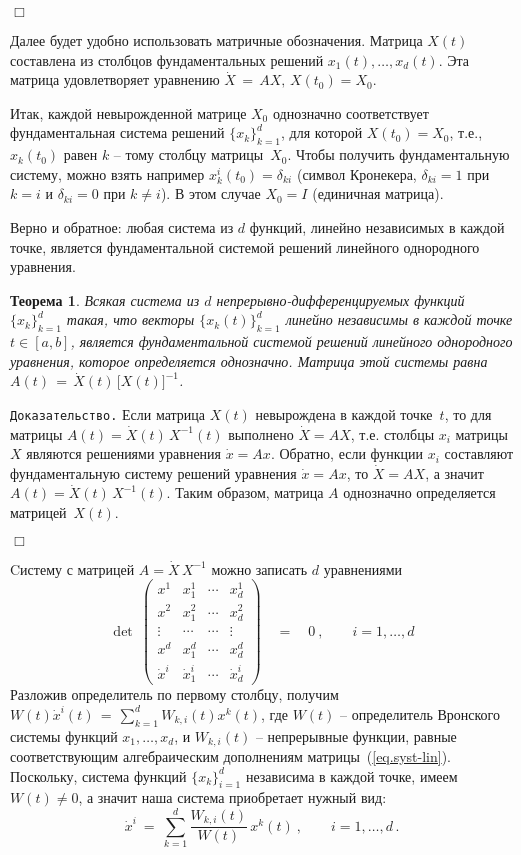 \documentclass[12pt,a4paper]{article}
\newtheorem{theorem}{Теорема}
\begin{document}
   {\hfill $\Box$}
\medskip

Далее будет удобно использовать матричные обозначения. Матрица $X(t)$ составлена из
столбцов фундаментальных решений $x_1(t), \ldots, x_d(t)$. Эта матрица удовлетворяет
уравнению $\dot X \, = \, A X, \,  X(t_0) = X_0$.

Итак, каждой невырожденной матрице $X_0$ однозначно соответствует фундаментальная система
решений $\{x_k\}_{k=1}^d$, для которой $X(t_0) = X_0$, т.е., $x_k(t_0)$ равен $k$ -- тому столбцу матрицы~$X_0$.
Чтобы получить фундаментальную систему, можно взять например
$x_k^i(t_0) = \delta_{ki}$ (символ Кронекера, $\delta_{ki} = 1$ при $k=i$ и $\delta_{ki}=0$ при $k\ne i$).
В этом случае $X_0 = I$ (единичная матрица).
\smallskip

Верно и обратное: любая система из $d$ функций, линейно независимых в каждой точке, является фундаментальной системой решений линейного однородного уравнения.
\begin{theorem}\label{th.syst-lin}
Всякая система из $d$ непрерывно-дифференцируемых функций $\{x_k\}_{k=1}^d$ такая, что векторы $\{x_k(t)\}_{k=1}^d$
линейно независимы в каждой точке $t\in [a,b]$, является фундаментальной системой решений линейного однородного уравнения, которое определяется однозначно. Матрица этой системы равна $A(t)\, = \, \dot X (t)\, \bigl[ X(t)\bigr]^{-1}$.
\end{theorem}
{\tt Доказательство.}
Если матрица $X(t)$ невырождена в каждой точке~$t$, то для матрицы $A(t) = \dot X (t)\, X^{-1}(t)$
 выполнено $\dot X = AX$, т.е. столбцы $x_i$ матрицы $X$ являются решениями уравнения $\dot x = Ax$.
 Обратно, если функции $x_i$ составляют фундаментальную систему решений уравнения
  $\dot x = Ax$, то $\dot X = AX$, а значит  $A(t) = \dot X (t)\, X^{-1}(t)$.
Таким образом, матрица $A$ однозначно определяется матрицей~$X(t)$.

   {\hfill $\Box$}
\medskip



Cистему с матрицей $A = \dot X \, X^{-1}$ можно записать $d$ уравнениями
\begin{equation}\label{eq.syst-lin}
\det \ \left(
\begin{array}{cccc}
x^1 & x_{1}^1 & \cdots & x_{d}^1\\
x^2 & x_{1}^2 & \cdots &  x_{d}^2\\
\vdots  &  \cdots &   \cdots & \vdots \\
x^d &  x_{1}^d & \cdots &  x_{d}^d\\
\dot x^i & \dot x_{1}^i & \cdots &  \dot x_{d}^i
\end{array}
\right)\quad = \quad 0\ , \qquad i = 1, \ldots , d
\end{equation}
Разложив определитель по первому столбцу,
получим $W(t) \dot x^i(t)  \, = \, \sum_{k=1}^d W_{k, i} (t) x^k(t)$,
где $W(t)$ -- определитель Вронского системы функций $x_1, \ldots , x_d$,
и $W_{k, i}(t)$ -- непрерывные функции, равные соответствующим алгебраическим дополнениям матрицы~(\ref{eq.syst-lin}).
Поскольку, система функций $\{x_k\}_{i=1}^d$ независима в каждой точке, имеем $W(t)\ne 0$, а значит
наша система приобретает нужный вид:
$$
 \dot x^i  \  = \  \sum_{k=1}^d \frac{W_{k, i}(t)}{W(t)}  \, x^k(t)\ , \qquad i = 1, \ldots , d\, .
$$
\end{document}
